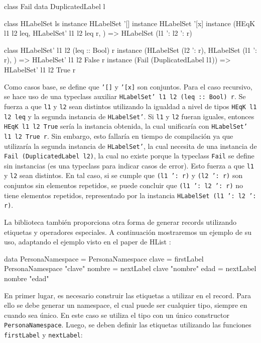 \begin{code}
class Fail
data DuplicatedLabel l

class HLabelSet ls
instance HLabelSet '[]
instance HLabelSet '[x]
instance (HEqK l1 l2 leq, 
  HLabelSet' l1 l2 leq r,
  ) => HLabelSet (l1 ': l2 ': r)

class HLabelSet' l1 l2 (leq :: Bool) r
instance (HLabelSet (l2 ': r),
  HLabelSet (l1 ': r),
  ) => HLabelSet' l1 l2 False r
instance (Fail (DuplicatedLabel l1)) =>
  HLabelSet' l1 l2 True r
\end{code}

Como casos base, se define que \texttt{'[]} y \texttt{'[x]} son conjuntos. Para el caso recursivo, se hace uso de una typeclass auxiliar \texttt{HLabelSet' l1 l2 (leq :: Bool) r}. Se fuerza a que \texttt{l1} y \texttt{l2} sean distintos utilizando la igualdad a nivel de tipos \texttt{HEqK l1 l2 leq} y la segunda instancia de \texttt{HLabelSet'}. Si \texttt{l1} y \texttt{l2} fueran iguales, entonces \texttt{HEqK l1 l2 True} sería la instancia obtenida, la cual unificaría con \texttt{HLabelSet' l1 l2 True r}. Sin embargo, esto fallaría en tiempo de compilación ya que utilizaría la segunda instancia de \texttt{HLabelSet'}, la cual necesita de una instancia de \texttt{Fail (DuplicatedLabel l2)}, la cual no existe porque la typeclass \texttt{Fail} se define sin instancias (es una typeclass para indicar casos de error). Esto fuerza a que \texttt{l1} y \texttt{l2} sean distintos. En tal caso, si se cumple que \texttt{(l1 ': r)} y \texttt{(l2 ': r)} son conjuntos sin elementos repetidos, se puede concluir que \texttt{(l1 ': l2 ': r)} no tiene elementos repetidos, representado por la instancia \texttt{HLabelSet (l1 ': l2 ': r)}.

La biblioteca también proporciona otra forma de generar records utilizando etiquetas y operadores especiales. A continuación mostraremos un ejemplo de su uso, adaptando el ejemplo visto en el paper de HList \cite{Kiselyov:2004:STH:1017472.1017488}:

\begin{code}
data PersonaNamespace = PersonaNamespace
clave = firstLabel PersonaNamespace "clave"
nombre = nextLabel clave "nombre"
edad = nextLabel nombre "edad"
\end{code}

En primer lugar, es necesario construir las etiquetas a utilizar en el record. Para ello se debe generar un namespace, el cual puede ser cualquier tipo, siempre en cuando sea único. En este caso se utiliza el tipo con un único constructor \texttt{PersonaNamespace}. Luego, se deben definir las etiquetas utilizando las funciones \texttt{firstLabel} y \texttt{nextLabel}:

